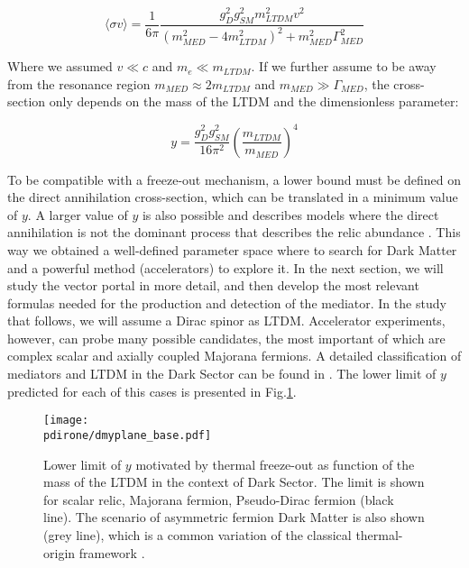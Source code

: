   \begin{equation}
    \label{eq:dm-cs-fo}
    \langle \sigma v \rangle = \frac{1}{6\pi}\frac{g^2_D g^2_{SM} m^2_{LTDM} v^2}{(m^2_{MED} - 4m^2_{LTDM})^2 + m^2_{MED}\Gamma^2_{MED}}
    \end{equation}

    
    Where we assumed $v \ll c$ and $m_e \ll m_{LTDM}$. If we further assume to be away from the resonance region $m_{MED} \approx 2m_{LTDM}$ and $m_{MED} \gg \Gamma_{MED}$, the cross-section only depends on the mass of the LTDM and the dimensionless parameter:

    \begin{equation}
      \label{eq:dmplane-y}
      y = \frac{g^2_D g^2_{SM}}{16 \pi^2} \left( \frac{m_{LTDM}}{m_{MED}} \right)^4
    \end{equation}

    To be compatible with a freeze-out mechanism, a lower bound must be defined on the direct annihilation cross-section, which can be translated in a minimum value of $y$. A larger value of $y$ is also possible and describes models where the direct annihilation is not the dominant process that describes the relic abundance \cite{battaglieri2017cosmic}. This way we obtained a well-defined parameter space where to search for Dark Matter and a powerful method (accelerators) to explore it. In the next section, we will study the vector portal in more detail, and then develop the most relevant formulas needed for the production and detection of the mediator. In the study that follows, we will assume a Dirac spinor as LTDM. Accelerator experiments, however, can probe many possible candidates, the most important of which are complex scalar and axially coupled Majorana fermions. A detailed classification of mediators and LTDM in the Dark Sector can be found in \cite{PhysRevD.92.123531}. The lower limit of $y$ predicted for each of this cases is presented in Fig.\ref{fig:dmyplane-base}.

    \begin{figure}[bth!]
      \centering
      \texttt{[image: \\pdirone/dmyplane\_base.pdf]}
      \caption[Lower limit of $y$ in dark sector]{Lower limit of $y$ motivated by thermal freeze-out as function of the mass of the LTDM in the context of Dark Sector. The limit is shown for scalar relic, Majorana fermion, Pseudo-Dirac fermion (black line). The scenario of asymmetric fermion Dark Matter is also shown (grey line), which is a common variation of the classical thermal-origin framework \cite{battaglieri2017cosmic}.}
      \label{fig:dmyplane-base}
    \end{figure}

